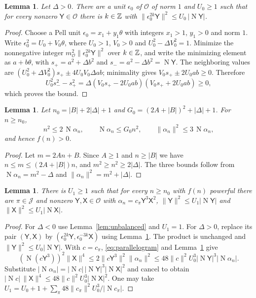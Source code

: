 \documentclass[11pt,reqno]{amsart}
\newtheorem{lemma}[theorem]{Lemma}
\theoremstyle{definition}
\theoremstyle{remark}
\numberwithin{equation}{section}
\newcommand{\OO}{\mathcal O}
\newcommand{\Nm}{\operatorname{N}}
\begin{document}
\begin{lemma}\label{lem:balance}
Let $\Delta>0$. There are a unit $\epsilon_0$ of $\OO$ of norm $1$ and
$U_0\ge1$ such that for every nonzero $\mathsf Y\in\OO$ there is $k\in\mathbb Z$ with
$\|\epsilon_0^{2k}\mathsf Y\|^2\le U_0\,|\Nm \mathsf Y|$.
\end{lemma}
\begin{proof}
Choose a Pell unit $\epsilon_0=x_1+y_1\theta$ with integers $x_1>1$,
$y_1>0$ and norm $1$. Write $\epsilon_0^2=U_0+V_0\theta$, where
$U_0>1$, $V_0>0$ and $U_0^2-\Delta V_0^2=1$. Minimize the nonnegative
integer $m_{\OO}^2\|\epsilon_0^{2k}\mathsf Y\|^2$ over $k\in\mathbb Z$,
and write the minimizing element as $a+b\theta$, with
$s_+=a^2+\Delta b^2$ and $s_-=a^2-\Delta b^2=\Nm\mathsf Y$.
The neighboring values are
$(U_0^2+\Delta V_0^2)s_+\pm4U_0V_0\Delta ab$; minimality gives
$V_0s_+\pm2U_0ab\ge0$. Therefore
\[
 U_0^2s_-^2-s_+^2
 =\Delta(V_0s_+-2U_0ab)(V_0s_++2U_0ab)\ge0,
\]
which proves the bound.
\end{proof}

\begin{lemma}\label{lem:growth}
Let $n_0=|B|+2|\Delta|+1$ and $G_0=(2A+|B|)^2+|\Delta|+1$. For $n\ge n_0$,
\[
 n^2\le2\,\Nm\alpha_n,\qquad \Nm\alpha_n\le G_0n^2,\qquad
 \|\alpha_n\|^2\le3\,\Nm\alpha_n ,
\]
and hence $f(n)>0$.
\end{lemma}
\begin{proof}
Let $m=2An+B$. Since $A\ge1$ and $n\ge|B|$ we have $n\le m\le(2A+|B|)n$, and
$m^2\ge n^2\ge2|\Delta|$. The three bounds follow from
$\Nm\alpha_n=m^2-\Delta$ and $\|\alpha_n\|^2=m^2+|\Delta|$.
\end{proof}

\begin{lemma}\label{lem:balancedcover}
There is $U_1\ge1$ such that for every $n\ge n_0$ with $f(n)$ powerful there
are $\pi\in\mathcal J$ and nonzero $\mathsf Y,\mathsf X\in\OO$ with $\alpha_n=c_\pi \mathsf Y^3\mathsf X^2$,
$\|\mathsf Y\|^2\le U_1|\Nm \mathsf Y|$ and $\|\mathsf X\|^2\le U_1|\Nm \mathsf X|$.
\end{lemma}
\begin{proof}
For $\Delta<0$ use Lemma~\ref{lem:unbalanced} and $U_1=1$.
For $\Delta>0$, replace its pair $(\mathsf Y,\mathsf X)$ by
$(\epsilon_0^{2k}\mathsf Y,\epsilon_0^{-3k}\mathsf X)$ using
Lemma~\ref{lem:balance}. The product is unchanged and
$\|\mathsf Y\|^2\le U_0|\Nm\mathsf Y|$. With $c=c_\pi$,
\eqref{eq:parallelogram} and Lemma~\ref{lem:growth} give
\[
 (\Nm(c\mathsf Y^3))^2\|\mathsf X\|^4
 \le2\|c\mathsf Y^3\|^2\|\alpha_n\|^2
 \le48\|c\|^2U_0^3|\Nm\mathsf Y|^3|\Nm\alpha_n|.
\]
Substitute $|\Nm\alpha_n|=|\Nm c|\,|\Nm\mathsf Y|^3|\Nm\mathsf X|^2$
and cancel to obtain
$|\Nm c|\,\|\mathsf X\|^4\le48\|c\|^2U_0^3|\Nm\mathsf X|^2$.
One may take $U_1=U_0+1+\sum_\pi48\|c_\pi\|^2U_0^3/|\Nm c_\pi|$.
\end{proof}
\end{document}
